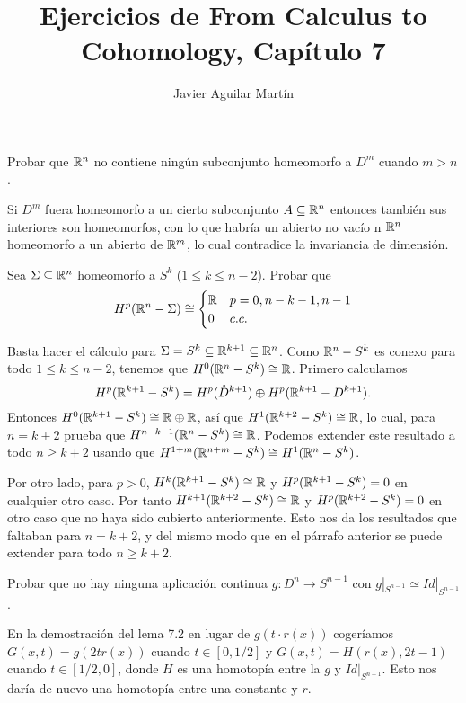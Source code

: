 \documentclass[twoside]{article}
\begin{document}
\title{Ejercicios de From Calculus to Cohomology, Capítulo 7}
\author{Javier Aguilar Martín}
\maketitle


\begin{ejercicio}{7.1}
 Probar que $\mathbb{R}^n$ no contiene ningún subconjunto homeomorfo a $D^m$ cuando $m>n$.
\end{ejercicio}
\begin{solucion}
Si $D^m$ fuera homeomorfo a un cierto subconjunto $A\subseteq\mathbb{R}^n$ entonces también sus interiores son homeomorfos, con lo que habría un abierto no vacío n $\mathbb{R}^n$ homeomorfo a un abierto de $\mathbb{R}^m$, lo cual contradice la invariancia de dimensión.


\end{solucion}

\newpage

\begin{ejercicio}{7.2}
Sea $\Sigma\subseteq\mathbb{R}^n$ homeomorfo a $S^k$ ($1\leq k\leq n-2$). Probar que
\[
H^p(\mathbb{R}^n-\Sigma)\cong\begin{cases}
\mathbb{R}& p=0,n-k-1,n-1\\
0 & c.c.
\end{cases}
\]
\end{ejercicio}
\begin{solucion}
Basta hacer el cálculo para $\Sigma=S^k\subseteq\mathbb{R}^{k+1}\subseteq\mathbb{R}^n$. Como $\mathbb{R}^n-S^k$ es conexo para todo $1\leq k\leq n-2$, tenemos que $H^0(\mathbb{R}^n-S^k)\cong\mathbb{R}$. Primero calculamos
\[
H^p(\mathbb{R}^{k+1}-S^k)=H^p(\mathring{D}^{k+1})\oplus H^p(\mathbb{R}^{k+1}-D^{k+1}).
\]
Entonces $H^0(\mathbb{R}^{k+1}-S^k)\cong \mathbb{R}\oplus\mathbb{R}$, así que $H^1(\mathbb{R}^{k+2}-S^k)\cong\mathbb{R}$, lo cual, para $n=k+2$ prueba que $H^{n-k-1}(\mathbb{R}^n-S^k)\cong\mathbb{R}$. Podemos extender este resultado a todo $n\geq k+2$ usando que $H^{1+m}(\mathbb{R}^{n+m}-S^k)\cong H^1(\mathbb{R}^n-S^k)$. 

Por otro lado, para $p>0$, $H^k(\mathbb{R}^{k+1}-S^k)\cong \mathbb{R}$ y $H^p(\mathbb{R}^{k+1}-S^k)=0$ en cualquier otro caso. Por tanto $H^{k+1}(\mathbb{R}^{k+2}-S^k)\cong \mathbb{R}$ y $H^p(\mathbb{R}^{k+2}-S^k)=0$ en otro caso que no haya sido cubierto anteriormente.  Esto nos da los resultados que faltaban para $n=k+2$, y del mismo modo que en el párrafo anterior se puede extender para todo $n\geq k+2$.
\end{solucion}
\newpage

\begin{ejercicio}{7.3}
Probar que no hay ninguna aplicación continua $g:D^n\to S^{n-1}$ con $g|_{S^{n-1}}\simeq Id|_{S^{n-1}}$.
\end{ejercicio}
\begin{solucion}
En la demostración del lema 7.2 en lugar de $g(t\cdot r(x))$ cogeríamos $G(x,t)=g(2tr(x))$ cuando $t\in [0,1/2]$ y $G(x,t)=H(r(x), 2t-1)$ cuando $t\in [1/2,0]$, donde $H$ es una homotopía entre la $g$ y $Id|_{S^{n-1}}$. Esto nos daría de nuevo una homotopía entre una constante y $r$.
\end{solucion}
\newpage
\end{document}
